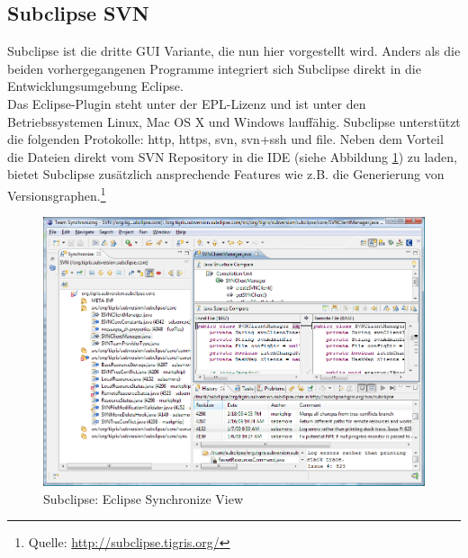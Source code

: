\subsection{Subclipse SVN}
Subclipse ist die dritte GUI Variante, die nun hier vorgestellt wird. Anders als die beiden vorhergegangenen Programme integriert sich Subclipse direkt in die Entwicklungsumgebung Eclipse.\\
Das Eclipse-Plugin steht unter der EPL-Lizenz und ist unter den Betriebssystemen Linux, Mac OS X und Windows lauffähig. Subclipse unterstützt die folgenden Protokolle: http, https, svn, svn+ssh und file. Neben dem Vorteil die Dateien direkt vom SVN Repository in die IDE (siehe Abbildung \ref{fig:subclipse1}) zu laden, bietet Subclipse zusätzlich ansprechende Features wie z.B. die Generierung von Versionsgraphen.\footnote{Quelle: \url{http://subclipse.tigris.org/}}
\begin{figure}[!htb]
        \centering
        \includegraphics[width=1\textwidth]{5_subclipse1.png}
        \caption{Subclipse: Eclipse Synchronize View}
        \label{fig:subclipse1}
\end{figure}
